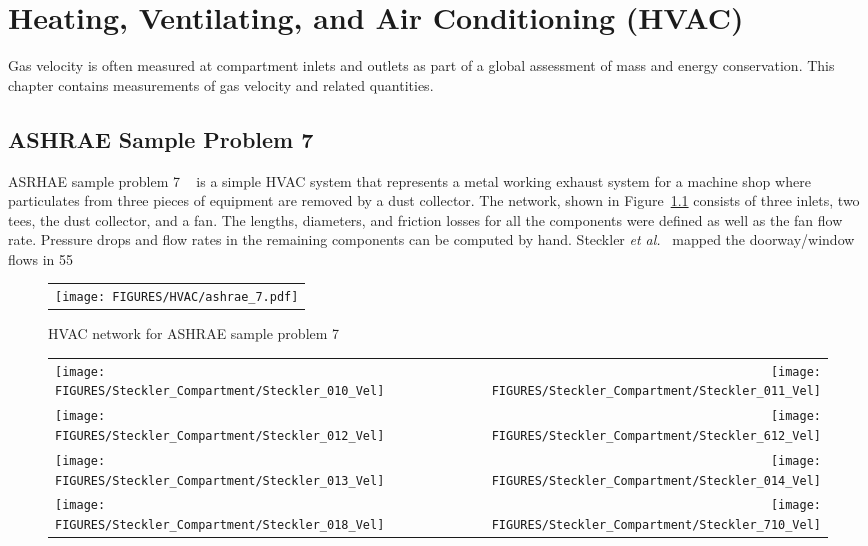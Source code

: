 \chapter{Heating, Ventilating, and Air Conditioning (HVAC)}

Gas velocity is often measured at compartment inlets and outlets as part of a global assessment of mass and
energy conservation.  This chapter contains measurements of gas velocity and related quantities.

\section{ASHRAE Sample Problem 7}

ASRHAE sample problem 7 ~\cite{ASHRAE} is a simple HVAC system that represents a metal working exhaust system for a machine shop where particulates from three pieces of equipment are removed by a dust collector.  The network, shown in Figure~\ref{ASHRAE7_schematic} consists of three inlets, two tees, the dust collector, and a fan.  The lengths, diameters, and friction losses for all the components were defined as well as the fan flow rate.  Pressure drops and flow rates in the remaining components can be computed by hand.  
Steckler {\em et al.}~\cite{Steckler:NBSIR_82-2520} mapped the doorway/window flows in 55 

\begin{figure}[p]
\begin{center}
\begin{tabular}{l}
\texttt{[image: FIGURES/HVAC/ashrae\_7.pdf]}
\end{tabular}
\end{center}
\caption {HVAC network for ASHRAE sample problem 7}
\label{ASHRAE7_schematic}
\end{figure}

\newpage





\begin{figure}[p]
\begin{tabular*}{\textwidth}{l@{\extracolsep{\fill}}r}
\texttt{[image: FIGURES/Steckler\_Compartment/Steckler\_010\_Vel]} &
\texttt{[image: FIGURES/Steckler\_Compartment/Steckler\_011\_Vel]} \\
\texttt{[image: FIGURES/Steckler\_Compartment/Steckler\_012\_Vel]} &
\texttt{[image: FIGURES/Steckler\_Compartment/Steckler\_612\_Vel]} \\
\texttt{[image: FIGURES/Steckler\_Compartment/Steckler\_013\_Vel]} &
\texttt{[image: FIGURES/Steckler\_Compartment/Steckler\_014\_Vel]} \\
\texttt{[image: FIGURES/Steckler\_Compartment/Steckler\_018\_Vel]} &
\texttt{[image: FIGURES/Steckler\_Compartment/Steckler\_710\_Vel]}
\end{tabular*}
\label{Steckler_Vel_1}
\end{figure}

